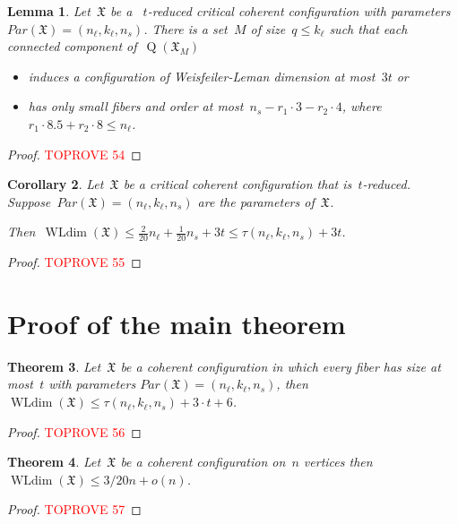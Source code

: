 \documentclass[english,a4paper]{article}
\theoremstyle{plain}
\newtheorem{theorem}             {Theorem}[section]
\newtheorem{lemma}      [theorem]{Lemma}
\newtheorem{corollary}  [theorem]{Corollary}
\theoremstyle{definition}
\newcommand{\coherentConfig}{\ensuremath{\mathfrak{X}}}
\DeclareMathOperator*{\WLdim}{WLdim}
\newcommand{\wldim}[1]{\ensuremath{\WLdim\left(#1\right)}}
\DeclareMathOperator*{\Quotient}{Q}
\newcommand{\quotientGraph}[1]{\ensuremath{\Quotient(#1)}}
\begin{document}
\begin{lemma}
\label{lem:the:newest:global-argument}
    Let~$\coherentConfig$ be a ~$t$-reduced critical coherent configuration with parameters~$Par(\coherentConfig)=(n_\ell, k_\ell,n_s)$.
    There is a set~$M$ of size~$q\leq k_\ell$ such that each connected component of~$\quotientGraph{\coherentConfig_M}$
    \begin{itemize}
        \item induces a configuration of Weisfeiler-Leman dimension at most~$3t$ or
        \item has only small fibers and order at most~$n_s - r_1 \cdot 3-r_2\cdot 4$, where~$r_1\cdot 8.5 +r_2\cdot 8\leq n_\ell$.
    \end{itemize}
\end{lemma}
\begin{proof}\textcolor{red}{TOPROVE 54}\end{proof}


\begin{corollary}
\label{cor:of:main:global}
    Let~$\coherentConfig$ be a critical coherent configuration that is~$t$-reduced. Suppose~$Par(\coherentConfig)=(n_\ell, k_\ell,n_s)$ are the parameters of~$\coherentConfig$.

    Then~$\wldim{\coherentConfig}\leq \frac{2}{20} n_\ell + \frac{1}{20}n_s+3t\leq \tau(n_\ell, k_\ell,n_s) + 3t$.
\end{corollary}
\begin{proof}\textcolor{red}{TOPROVE 55}\end{proof}

     


\section{Proof of the main theorem}
\label{sec:proof:of:main:thm}


\begin{theorem}
    Let~$\coherentConfig$ be a coherent configuration in which every fiber has size at most~$t$ with parameters $Par(\coherentConfig)=(n_\ell, k_\ell,n_s)$,  then~$\wldim{\coherentConfig}\leq \tau(n_\ell, k_\ell,n_s)+3\cdot t+6$.
\end{theorem}
\begin{proof}\textcolor{red}{TOPROVE 56}\end{proof}

\begin{theorem}
    Let~$\coherentConfig$ be a coherent configuration on~$n$ vertices then~$\wldim{\coherentConfig}\leq 3/20 n + o(n)$.
\end{theorem}
\begin{proof}\textcolor{red}{TOPROVE 57}\end{proof}
     
\end{document}
